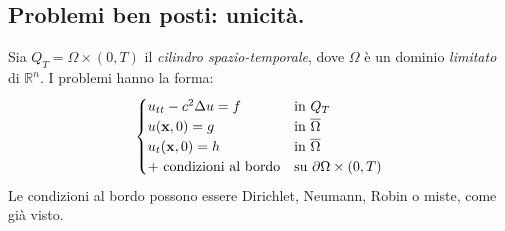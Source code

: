 \subsection{Problemi ben posti: unicità.}

Sia $Q_{T} =\Omega \times (0,T)$ il \textit{cilindro spazio-temporale}, dove $\Omega $ è un dominio \textit{limitato} di $\mathbb{R}^{n}$. I problemi hanno la forma:
\begin{equation}
    \begin{cases}
        u_{tt} -c^{2} \Delta u=f      & \text{in} \ Q_{T}                        \\
        u(\x ,0) =g                   & \text{in} \ \overline{\Omega }           \\
        u_{t}(\x ,0) =h               & \text{in} \ \overline{\Omega }           \\
        +\ \text{condizioni al bordo} & \text{su} \ \partial \Omega \times (0,T)
    \end{cases}
    \label{eq:problema-generico-onde-unicita}
\end{equation}
Le condizioni al bordo possono essere Dirichlet, Neumann, Robin o miste, come già visto.

